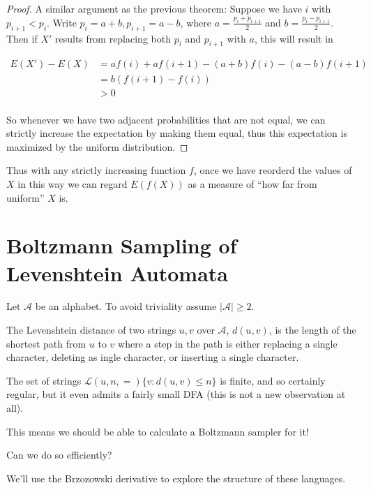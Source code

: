 \documentclass[a4paper]{book}
\begin{document}
\begin{proof}
A similar argument as the previous theorem: Suppose we have \(i\) with \(p_{i + 1} < p_i\).
Write \(p_i = a + b, p_{i + 1} = a - b\),
where \(a = \frac{p_i + p_{i + 1}}{2}\) and \(b = \frac{p_i - p_{i + 1}}{2}\).
Then if \(X'\) results from replacing both \(p_i\) and \(p_{i + 1}\) with \(a\),
this will result in

\begin{align*}
E(X') - E(X) &= a f(i) + a f(i + 1) - (a + b) f(i) - (a - b) f(i + 1) \\
&= b (f(i + 1) - f(i)) \\
&> 0\\
\end{align*}

So whenever we have two adjacent probabilities that are not equal,
we can strictly increase the expectation by making them equal,
thus this expectation is maximized by the uniform distribution.

\end{proof}

Thus with any strictly increasing function \(f\),
once we have reorderd the values of \(X\) in this way we can regard \(E(f(X))\) as a measure of ``how far from uniform'' \(X\) is.

\section{Boltzmann Sampling of Levenshtein Automata}

\newcommand{\levlang}[2]{\mathcal{L} (#1, #2)}

Let \(\mathcal{A}\) be an alphabet.
To avoid triviality assume \(|\mathcal{A}| \geq 2\).

The Levenshtein distance of two strings \(u, v\) over \(\mathcal{A}\), \(d(u, v)\), is the length of the shortest path from \(u\) to \(v\) where a step in the path is either replacing a single character, deleting as ingle character, or inserting a single character.

The set of strings \(\levlang{u, n} = \{ v: d(u, v) \leq n \}\) is finite,
and so certainly regular,
but it even admits a fairly small DFA (this is not a new observation at all).

This means we should be able to calculate a Boltzmann sampler for it\cite{falbs}!

Can we do so efficiently?

We'll use the Brzozowski derivative to explore the structure of these languages.
\end{document}
